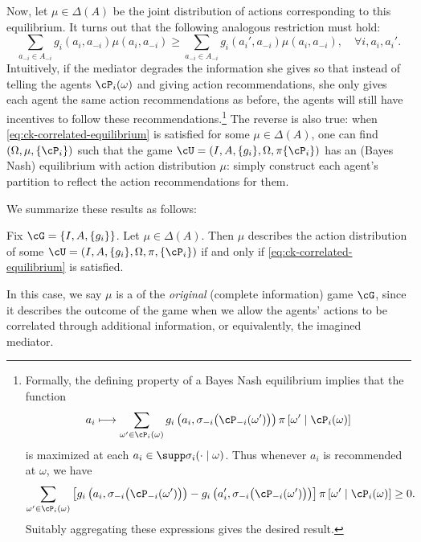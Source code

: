 Now, let \(\mu \in \Delta(A)\) be the joint distribution of actions corresponding to this equilibrium.
It turns out that the following analogous restriction must hold:
\begin{equation}\label{eq:ck-correlated-equilibrium}
  \sum_{a_{-i} \in A_{-i}} g_i(a_i, a_{-i}) \mu(a_i, a_{-i})
  \geq \sum_{a_{-i} \in A_{-i}} g_i(a_i', a_{-i}) \mu(a_i, a_{-i})
  ,\quad \forall i, a_i, a_i'.
\end{equation}
Intuitively, if the mediator degrades the information she gives so that instead of telling the agents \(\cP_i(\omega)\) and giving action recommendations, she only gives each agent the same action recommendations as before, the agents will still have incentives to follow these recommendations.\footnote{
  Formally, the defining property of a Bayes Nash equilibrium implies that the function
  \[
    a_i \longmapsto \sum_{\omega' \in \cP_i(\omega)} g_i\left( a_i, \sigma_{-i}\big(\cP_{-i}(\omega')\big) \right) \pi\left[ \omega' \mid \cP_i(\omega) \right]
  \]
  is maximized at each \(a_i \in \supp \sigma_i(\cdot \mid \omega)\).
  Thus whenever \(a_i\) is recommended at \(\omega\), we have
  \[
    \sum_{\omega' \in \cP_i(\omega)} \left[ g_i\left(a_i, \sigma_{-i}\big(\cP_{-i}(\omega')\big) \right) - g_i\left( a_i', \sigma_{-i}\big(\cP_{-i}(\omega')\big) \right) \right] \pi \left[ \omega' \mid \cP_i(\omega) \right]\geq 0.
  \]
  Suitably aggregating these expressions gives the desired result.
}
The reverse is also true: when \eqref{eq:ck-correlated-equilibrium} is satisfied for some \(\mu \in \Delta(A)\), one can find \((\Omega, \mu, \{\cP_i\})\) such that the game \(\cU = (I, A, \{g_i\}, \Omega, \pi \{\cP_i\})\) has an (Bayes Nash) equilibrium with action distribution \(\mu\): simply construct each agent's partition to reflect the action recommendations for them.

We summarize these results as follows:
\begin{proposition}
  Fix \(\cG = \{I, A, \{g_i\}\}\).
  Let \(\mu \in \Delta(A)\).
  Then \(\mu\) describes the action distribution of some \(\cU = (I, A, \{g_i\}, \Omega, \pi, \{\cP_i\})\) if and only if \eqref{eq:ck-correlated-equilibrium} is satisfied.
\end{proposition}

In this case, we say \(\mu\) is a  of the \emph{original} (complete information) game \(\cG\), since it describes the outcome of the game when we allow the agents' actions to be correlated through additional information, or equivalently, the imagined mediator.

